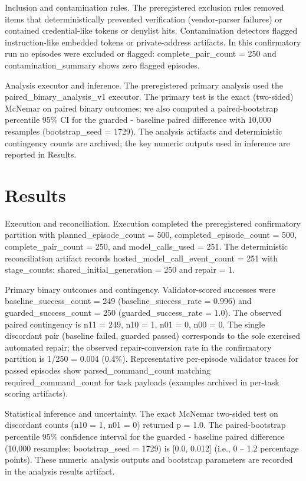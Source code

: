 \documentclass[conference]{IEEEtran}
\begin{document}
Inclusion and contamination rules. The preregistered exclusion rules removed items that deterministically prevented verification (vendor-parser failures) or contained credential-like tokens or denylist hits. Contamination detectors flagged instruction-like embedded tokens or private-address artifacts. In this confirmatory run no episodes were excluded or flagged: complete\_pair\_count = 250 and contamination\_summary shows zero flagged episodes.

Analysis executor and inference. The preregistered primary analysis used the paired\_binary\_analysis\_v1 executor. The primary test is the exact (two-sided) McNemar on paired binary outcomes; we also computed a paired-bootstrap percentile 95\% CI for the guarded - baseline paired difference with 10,000 resamples (bootstrap\_seed = 1729). The analysis artifacts and deterministic contingency counts are archived; the key numeric outputs used in inference are reported in Results.

\section{Results}
Execution and reconciliation. Execution completed the preregistered confirmatory partition with planned\_episode\_count = 500, completed\_episode\_count = 500, complete\_pair\_count = 250, and model\_calls\_used = 251. The deterministic reconciliation artifact records hosted\_model\_call\_event\_count = 251 with stage\_counts: shared\_initial\_generation = 250 and repair = 1.

Primary binary outcomes and contingency. Validator-scored successes were baseline\_success\_count = 249 (baseline\_success\_rate = 0.996) and guarded\_success\_count = 250 (guarded\_success\_rate = 1.0). The observed paired contingency is n11 = 249, n10 = 1, n01 = 0, n00 = 0. The single discordant pair (baseline failed, guarded passed) corresponds to the sole exercised automated repair; the observed repair-conversion rate in the confirmatory partition is 1/250 = 0.004 (0.4\%). Representative per-episode validator traces for passed episodes show parsed\_command\_count matching required\_command\_count for task payloads (examples archived in per-task scoring artifacts).

Statistical inference and uncertainty. The exact McNemar two-sided test on discordant counts (n10 = 1, n01 = 0) returned p = 1.0. The paired-bootstrap percentile 95\% confidence interval for the guarded - baseline paired difference (10,000 resamples; bootstrap\_seed = 1729) is [0.0, 0.012] (i.e., 0 -- 1.2 percentage points). These numeric analysis outputs and bootstrap parameters are recorded in the analysis results artifact.
\end{document}
